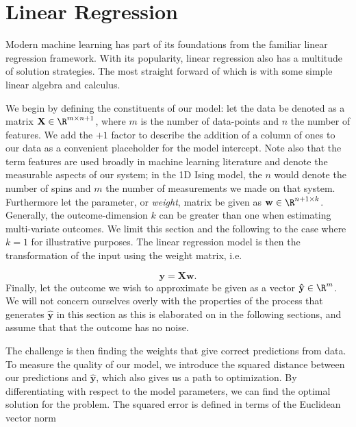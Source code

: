 
\section{Linear Regression}\label{sec:LinReg}

Modern machine learning has part of its foundations from the familiar linear regression framework. With its popularity, linear regression also has a multitude of solution strategies. The most straight forward of which is with some simple linear algebra and calculus.

We begin by defining the constituents of our model: let the data be denoted as a matrix $\mathbf{X} \in \R^{m\times n+1}$, where $m$ is the number of data-points and $n$ the number of features. We add the $+1$ factor to describe the addition of a column of ones to our data as a convenient placeholder for the model intercept. Note also that the term features are used broadly in machine learning literature and denote the measurable aspects of our system; in the 1D Ising model, the $n$ would denote the number of spins and $m$ the number of measurements we made on that system. Furthermore let the parameter, or \textit{weight}, matrix be given as $\mathbf{w} \in \R^{n + 1\times k}$. Generally, the outcome-dimension $k$ can be greater than one when estimating multi-variate outcomes. We limit this section and the following to the case where $k=1$ for illustrative purposes. The linear regression model is then the transformation of the input using the weight matrix, i.e. 

\begin{equation}\label{eq:og_linreg}
\mathbf{y} = \mathbf{X}\mathbf{w}.
\end{equation}
\noindent Finally, let the outcome we wish to approximate be given as a vector $\mathbf{\hat{y}} \in \R^m$. We will not concern ourselves overly with the properties of the process that generates $\mathbf{\hat{y}}$ in this section as this is elaborated on in the following sections, and assume that that the outcome has no noise.

The challenge is then finding the weights that give correct predictions from data. To measure the quality of our model, we introduce the squared distance between our predictions and $\mathbf{\hat{y}}$, which also gives us a path to optimization. By differentiating with respect to the model parameters, we can find the optimal solution for the problem. The squared error is defined in terms of the Euclidean vector norm  

